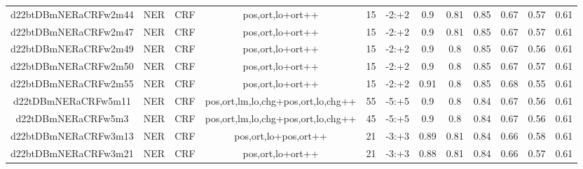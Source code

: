 \documentclass[a4paper]{article}
\begin{document}
\begin{landscape}
\begin{center}
\begin{tabular}{ |c|c|c|c|c|c|c|c|c|c|c|c|}
 	
 
 	
 		
 		\small{ d22btDBmNERaCRFw2m44 } & NER & CRF & pos,ort,lo+ort++  &  15 &  -2:+2  &  0.9 & 0.81 & 0.85  &  0.67 & 0.57 & 0.61 \\
 		

 	
 
 	
 		
 		\small{ d22btDBmNERaCRFw2m47 } & NER & CRF & pos,ort,lo+ort++  &  15 &  -2:+2  &  0.9 & 0.81 & 0.85  &  0.67 & 0.57 & 0.61 \\
 		

 	
 
 	
 		
 		\small{ d22btDBmNERaCRFw2m49 } & NER & CRF & pos,ort,lo+ort++  &  15 &  -2:+2  &  0.9 & 0.8 & 0.85  &  0.67 & 0.56 & 0.61 \\
 		

 	
 
 	
 		
 		\small{ d22btDBmNERaCRFw2m50 } & NER & CRF & pos,ort,lo+ort++  &  15 &  -2:+2  &  0.9 & 0.8 & 0.85  &  0.67 & 0.57 & 0.61 \\
 		

 	
 
 	
 		
 		\small{ d22btDBmNERaCRFw2m55 } & NER & CRF & pos,ort,lo+ort++  &  15 &  -2:+2  &  0.91 & 0.8 & 0.85  &  0.68 & 0.55 & 0.61 \\
 		

 	
 
 	
 		
 		\small{ d22tDBmNERaCRFw5m11 } & NER & CRF & pos,ort,lm,lo,chg+pos,ort,lo,chg++  &  55 &  -5:+5  &  0.9 & 0.8 & 0.84  &  0.67 & 0.56 & 0.61 \\
 		

 	
 
 	
 		
 		\small{ d22tDBmNERaCRFw5m3 } & NER & CRF & pos,ort,lm,lo,chg+pos,ort,lo,chg++  &  45 &  -5:+5  &  0.9 & 0.8 & 0.84  &  0.67 & 0.56 & 0.61 \\
 		

 	
 
 	
 		
 		\small{ d22btDBmNERaCRFw3m13 } & NER & CRF & pos,ort,lo+pos,ort++  &  21 &  -3:+3  &  0.89 & 0.81 & 0.84  &  0.66 & 0.58 & 0.61 \\
 		

 	
 
 	
 		
 		\small{ d22btDBmNERaCRFw3m21 } & NER & CRF & pos,ort,lo+ort++  &  21 &  -3:+3  &  0.88 & 0.81 & 0.84  &  0.66 & 0.57 & 0.61 \\
 		


\end{tabular}
\end{center}
\end{landscape}
\end{document}
